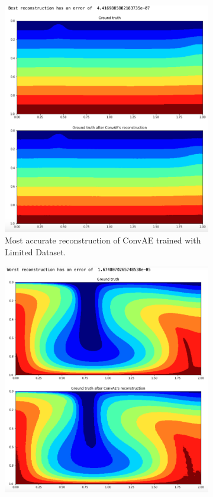 \begin{figure}[H]
\centering
\begin{subfigure}{0.45\textwidth}
    \includegraphics[width=\textwidth]{figures/mantle_convection_images/limited_dataset/ConvAE_Best.png}
    \caption{Most accurate reconstruction of ConvAE trained with Limited Dataset.}
    \label{figure:ConvAE_limited_best}
\end{subfigure}
\hfill
\begin{subfigure}{0.45\textwidth}
    \includegraphics[width=\textwidth]{figures/mantle_convection_images/limited_dataset/ConvAE_Worst.png}

\end{subfigure}
\end{figure}
